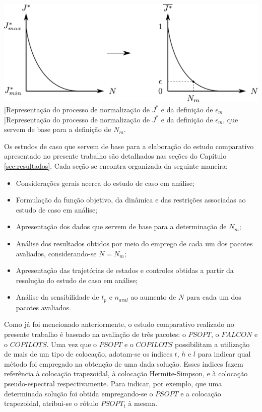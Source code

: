 \noindent	
\begin{minipage}{\textwidth}
	\vspace{\onelineskip}
	\centering
	\includegraphics[width=1\linewidth]{draw/metodologia/pdf/Jnorm}
	[Representação do processo de normalização de $ J^* $ e da definição de $ \epsilon_m $]{Representação do processo de normalização de $ J^* $ e da definição de $ \epsilon_m $, que servem de base para a definição de $ N_m $.}
	\label{fig:metodologia:Jnorm}
	\vspace{\onelineskip}
\end{minipage}


Os estudos de caso que servem de base para a elaboração do estudo comparativo apresentado no presente trabalho são detalhados nas seções do Capítulo \ref{sec:resultados}. Cada seção se encontra organizada da seguinte maneira:
%
\begin{itemize}
	\item Considerações gerais acerca do estudo de caso em análise;
	\item Formulação da função objetivo, da dinâmica e das restrições associadas ao estudo de caso em análise;
	\item Apresentação dos dados que servem de base para a determinação de $ N_m $;
	\item Análise dos resultados obtidos por meio do emprego de cada um dos pacotes avaliados, considerando-se $ N = N_m $;
	\item Apresentação das trajetórias de estados e controles obtidas a partir da resolução do estudo de caso em análise;
	\item Análise da sensibilidade de $ t_p $ e $ n_{aval} $ ao aumento de $ N $ para cada um dos pacotes avaliados.
\end{itemize} 

Como já foi mencionado anteriormente, o estudo comparativo realizado no presente trabalho é baseado na avaliação de três pacotes: o $ PSOPT $, o $ FALCON $ e o $ COPILOTS $. Uma vez que o $ PSOPT $ e o $ COPILOTS $ possibilitam a utilização de mais de um tipo de colocação, adotam-se os índices $ t $, $ h $ e $ l $ para indicar qual método foi empregado na obtenção de uma dada solução. Esses índices fazem referência à colocação trapezoidal, à colocação Hermite-Simpson, e à colocação pseudo-espectral respectivamente. Para indicar, por exemplo, que uma determinada solução foi obtida empregando-se o $ PSOPT $ e a colocação trapezoidal, atribui-se o rótulo $ PSOPT_t $ à mesma. 

